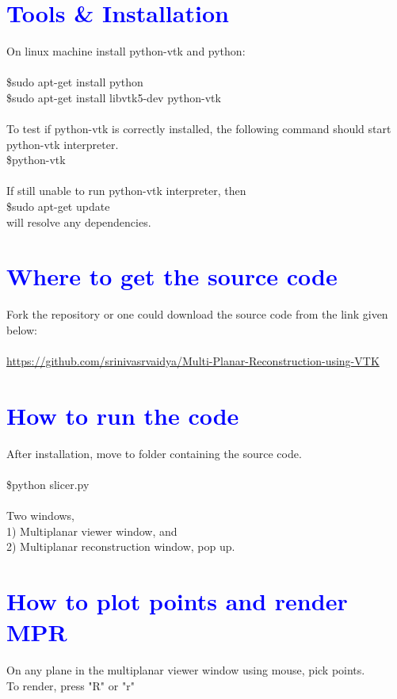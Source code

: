 \documentclass[12pt]{report}
\begin{document}
\section{\textcolor{blue}{Tools \& Installation} }
On linux machine install python-vtk and python:\\
\\
\$sudo apt-get install python
\\
\$sudo apt-get install libvtk5-dev python-vtk
\\
\\
To test if python-vtk is correctly installed, the following command should start python-vtk interpreter. 
\\
\$python-vtk
\\
\\
If still unable to run python-vtk interpreter, then
\\
\$sudo apt-get update
\\
will resolve any dependencies.

\section{\textcolor{blue}{Where to get the source code} }

Fork the repository or one could download the source code from the link given below:
\\
\\
\href{https://github.com/srinivasrvaidya/Multi-Planar-Reconstruction-using-VTK}{https://github.com/srinivasrvaidya/Multi-Planar-Reconstruction-using-VTK}

\section{\textcolor{blue}{How to run the code} }
After installation, move to folder containing the source code. 
\\
\\
\$python slicer.py
\\
\\
Two windows, \\1) Multiplanar viewer window, and
\\
2) Multiplanar reconstruction window, pop up.

\section{\textcolor{blue}{How to plot points and render MPR} }
On any plane in the multiplanar viewer window using mouse, pick points. \\
To render, press "R" or "r"
\end{document}
